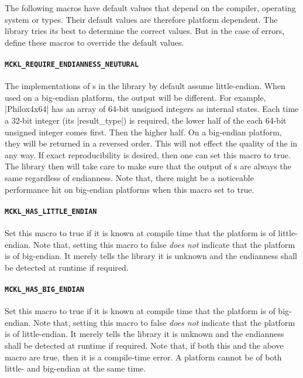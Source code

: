 The following macros have default values that depend on the compiler, operating
system or \cpu types. Their default values are therefore platform dependent.
The library tries its best to determine the correct values. But in the case of
errors, define these macros to override the default values.

\paragraph{\texttt{MCKL\_REQUIRE\_ENDIANNESS\_NEUTURAL}} The implementations of
\rng{}s in the library by default assume little-endian. When used on a
big-endian platform, the output will be different. For example, |Philox4x64|
has an array of 64-bit unsigned integers as internal states. Each time a 32-bit
integer (its |result_type|) is required, the lower half of the each 64-bit
unsigned integer comes first. Then the higher half. On a big-endian platform,
they will be returned in a reversed order. This will not effect the quality of
the \rng in any way. If exact reproducibility is desired, then one can set this
macro to true. The library then will take care to make sure that the output of
\rng{}s are always the same regardless of endianness. Note that, there might be
a noticeable performance hit on big-endian platforms when this macro set to
true.

\paragraph{\texttt{MCKL\_HAS\_LITTLE\_ENDIAN}} Set this macro to true if it is
known at compile time that the platform is of little-endian. Note that, setting
this macro to false \emph{does not} indicate that the platform is of
big-endian. It merely tells the library it is unknown and the endianness shall
be detected at runtime if required.

\paragraph{\texttt{MCKL\_HAS\_BIG\_ENDIAN}} Set this macro to true if it is
known at compile time that the platform is of big-endian. Note that, setting
this macro to false \emph{does not} indicate that the platform is of
little-endian. It merely tells the library it is unknown and the endianness
shall be detected at runtime if required. Note that, if both this and the above
macro are true, then it is a compile-time error. A platform cannot be of both
little- and big-endian at the same time.

